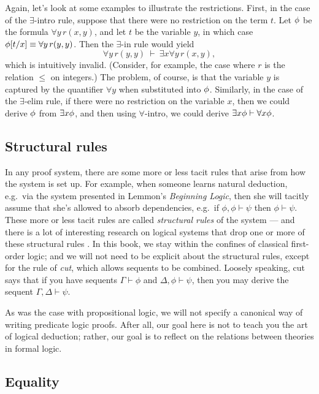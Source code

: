 Again, let's look at some examples to illustrate the restrictions.
First, in the case of the $\exists$-intro rule, suppose that there
were no restriction on the term $t$.  Let $\phi$ be the formula
$\forall y\,r(x,y)$, and let $t$ be the variable $y$, in which case
$\phi [t/x]\equiv \forall y\,r(y,y)$.  Then the $\exists$-in rule would
yield
\[ \forall y\,r(y,y) \: \vdash \: \exists x\forall y\,r(x,y ), \]
which is intuitively invalid.  (Consider, for example, the case where
$r$ is the relation $\leq$ on integers.)  The problem, of course, is
that the variable $y$ is captured by the quantifier $\forall y$ when
substituted into $\phi$.  Similarly, in the case of the $\exists$-elim
rule, if there were no restriction on the variable $x$, then we could
derive $\phi$ from $\exists x\phi$, and then using $\forall$-intro, we
could derive $\exists x\phi\vdash \forall x\phi$.

\subsection*{Structural rules}

In any proof system, there are some more or less tacit rules that
arise from how the system is set up.  For example, when someone learns
natural deduction, e.g.\ via the system presented in Lemmon's {\it
  Beginning Logic}, then she will tacitly assume that she's allowed to
absorb dependencies, e.g.\ if $\phi ,\phi\vdash \psi$ then
$\phi \vdash \psi$.  These more or less tacit rules are called
\emph{structural rules} of the system --- and there is a lot of
interesting research on logical systems that drop one or more of these
structural rules \cite[see][]{restall}.  In this book, we stay within
the confines of classical first-order logic; and we will not need to
be explicit about the structural rules, except for the rule of
\emph{cut}, which allows sequents to be combined.  Loosely speaking,
cut says that if you have sequents $\Gamma \vdash \phi$ and
$\Delta ,\phi\vdash \psi$, then you may derive the sequent
$\Gamma ,\Delta \vdash \psi$.

As was the case with propositional logic, we will not specify a
canonical way of writing predicate logic proofs.  After all, our goal
here is not to teach you the art of logical deduction; rather, our
goal is to reflect on the relations between theories in formal logic.


\subsection*{Equality}

